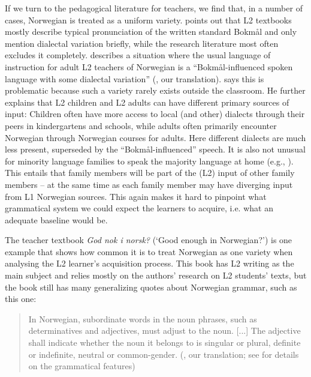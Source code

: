 \documentclass[output=paper,colorlinks,citecolor=brown,modfonts,nonflat]{../langscibook}
\begin{document}
If we turn to the pedagogical literature for teachers, we find that, in a number of cases, Norwegian is treated as a uniform variety. \citet{Heide2017} points out that L2 textbooks mostly describe typical pronunciation of the written standard Bokmål and only mention dialectal variation briefly, while the research literature most often excludes it completely. \citet{Husby2009} describes a situation where the usual language of instruction for adult L2 teachers of Norwegian is a “Bokmål-influenced spoken language with some dialectal variation” (\citealt{Husby2009}, our translation). \citeauthor{Husby2009} says this is problematic because such a variety rarely exists outside the classroom. He further explains that L2 children and L2 adults can have different primary sources of input: Children often have more access to local (and other) dialects through their peers in kindergartens and schools, while adults often primarily encounter Norwegian through Norwegian courses for adults. Here different dialects are much less present, superseded by the ``Bok\-mål-influenced'' speech. It is also not unusual for minority language families to speak the majority language at home (e.g., \citealt{BerggreenLatomaa1994,Kulbrandstad1997,Mancilla-MartinezKieffer2010,KarlsenLykkenborg2012,Fulland2016}). This entails that family members will be part of the (L2) input of other family members – at the same time as each family member may have diverging input from L1 Norwegian sources. This again makes it hard to pinpoint what grammatical system we could expect the learners to acquire, i.e. what an adequate baseline would be.

The teacher textbook \textit{God nok i norsk?} (‘Good enough in Norwegian?’) \citep{BerggreenEtAl2012} is one example that shows how common it is to treat Norwegian as one variety when analysing the L2 learner’s acquisition process. This book has L2 writing as the main subject and relies mostly on the authors’ research on L2 students’ texts, but the book still has many generalizing quotes about Norwegian grammar, such as this one:

\begin{quote}
  In Norwegian, subordinate words in the noun phrases, such as determinatives and
adjectives, must adjust to the noun. [...] The adjective shall indicate whether the noun 
it belongs to is singular or plural, definite or indefinite, neutral or common-gender.
(\citealt[80]{BerggreenEtAl2012}, our translation; see  for details on the grammatical features)
\end{quote}
\end{document}
